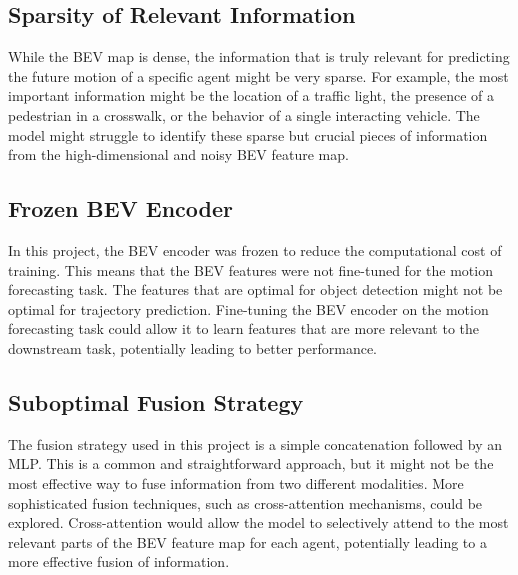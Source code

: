\subsection{Sparsity of Relevant Information}

While the BEV map is dense, the information that is truly relevant for predicting the future motion of a specific agent might be very sparse. For example, the most important information might be the location of a traffic light, the presence of a pedestrian in a crosswalk, or the behavior of a single interacting vehicle. The model might struggle to identify these sparse but crucial pieces of information from the high-dimensional and noisy BEV feature map.

\subsection{Frozen BEV Encoder}

In this project, the BEV encoder was frozen to reduce the computational cost of training. This means that the BEV features were not fine-tuned for the motion forecasting task. The features that are optimal for object detection might not be optimal for trajectory prediction. Fine-tuning the BEV encoder on the motion forecasting task could allow it to learn features that are more relevant to the downstream task, potentially leading to better performance.

\subsection{Suboptimal Fusion Strategy}

The fusion strategy used in this project is a simple concatenation followed by an MLP. This is a common and straightforward approach, but it might not be the most effective way to fuse information from two different modalities. More sophisticated fusion techniques, such as cross-attention mechanisms, could be explored. Cross-attention would allow the model to selectively attend to the most relevant parts of the BEV feature map for each agent, potentially leading to a more effective fusion of information.
